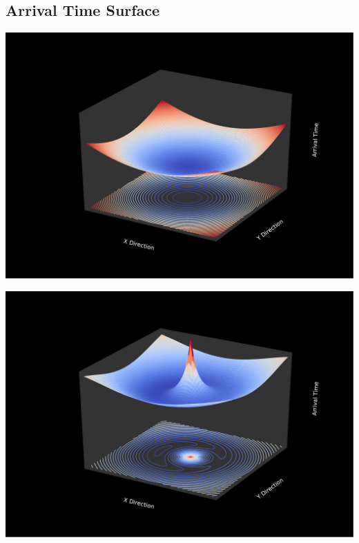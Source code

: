 \documentclass[aspectratio=1610]{beamer}
\begin{document}
\subsection{Arrival Time Surface}

{
\begin{frame}
  
  \hspace{-1.2cm}\includegraphics[width=\textwidth]{imgs/fig0}
\end{frame}

\begin{frame}
  \includegraphics[width=\textwidth]{imgs/fig3}
\end{frame}}

%
\end{document}
